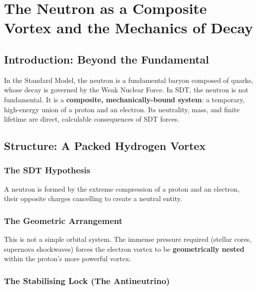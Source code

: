 \chapter{The Neutron as a Composite Vortex and the Mechanics of Decay}


\section{Introduction: Beyond the Fundamental}

In the Standard Model, the neutron is a fundamental baryon composed of quarks, whose decay is governed by the Weak Nuclear Force.  In SDT, the neutron is not fundamental.  It is a \textbf{composite, mechanically-bound system}: a temporary, high-energy union of a proton and an electron.  Its neutrality, mass, and finite lifetime are direct, calculable consequences of SDT forces.


\section{Structure: A Packed Hydrogen Vortex}

\subsection{The SDT Hypothesis}

A neutron is formed by the extreme compression of a proton and an electron, their opposite charges cancelling to create a neutral entity.

\subsection{The Geometric Arrangement}

This is not a simple orbital system.  The immense pressure required (stellar cores, supernova shockwaves) forces the electron vortex to be \textbf{geometrically nested} within the proton's more powerful vortex.

\subsection{The Stabilising Lock (The Antineutrino)}

